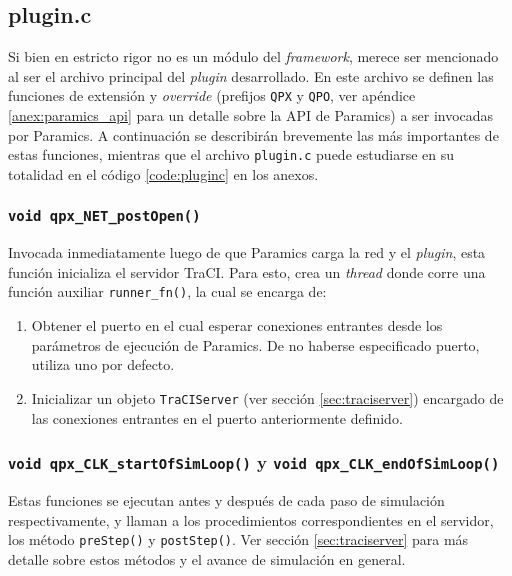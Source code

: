 \subsection{plugin.c}\label{sec:plugin.c}

Si bien en estricto rigor no es un módulo del \emph{framework}, merece ser mencionado al ser el archivo principal del \emph{plugin} desarrollado. En este archivo se definen las funciones de extensión y \emph{override} (prefijos \texttt{QPX} y \texttt{QPO}, ver apéndice \ref{anex:paramics_api} para un detalle sobre la API de Paramics) a ser invocadas por Paramics. A continuación se describirán brevemente las más importantes de estas funciones, mientras que el archivo \texttt{plugin.c} puede estudiarse en su totalidad en el código \ref{code:pluginc} en los anexos.

\subsubsection{\texttt{void qpx\_NET\_postOpen()}}\label{sec:qpx_postopen}

Invocada inmediatamente luego de que Paramics carga la red y el \emph{plugin}, esta función inicializa el servidor TraCI. Para esto, crea un \emph{thread} donde corre una función auxiliar \texttt{runner\_fn()}, la cual se encarga de:

\begin{enumerate}
    \item Obtener el puerto en el cual esperar conexiones entrantes desde los parámetros de ejecución de Paramics. De no haberse especificado puerto, utiliza uno por defecto.
    \item Inicializar un objeto \texttt{TraCIServer} (ver sección \ref{sec:traciserver}) encargado de las conexiones entrantes en el puerto anteriormente definido.
\end{enumerate}

\subsubsection{\texttt{void qpx\_CLK\_startOfSimLoop()} y \texttt{void qpx\_CLK\_endOfSimLoop()}}

Estas funciones se ejecutan antes y después de cada paso de simulación respectivamente, y llaman a los procedimientos correspondientes en el servidor, los método \texttt{preStep()} y \texttt{postStep()}. Ver sección \ref{sec:traciserver} para más detalle sobre estos métodos y el avance de simulación en general.

